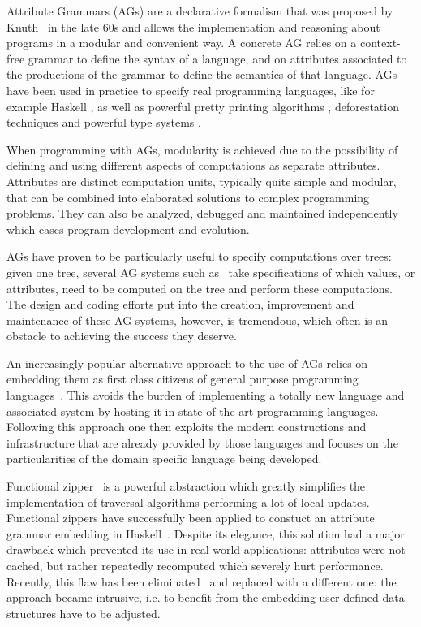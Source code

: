\documentclass[runningheads]{llncs}
\begin{document}
  Attribute Grammars (AGs) are a declarative formalism that was proposed by
  Knuth~\cite{Knuth68} in the late 60s and allows the implementation and
  reasoning about programs in a modular and convenient way. A concrete AG
  relies on a context-free grammar to define the syntax of a language, and on
  attributes associated to the productions of the grammar to define the
  semantics of that language.
  AGs have been used in practice to specify real programming languages, like
  for example Haskell \cite{DijkstraFS09}, as well as powerful pretty printing
  algorithms \cite{SPS99}, deforestation techniques \cite{joao07pepm} and
  powerful type systems \cite{MiddelkoopDS10}.

  When programming with AGs, modularity is achieved due to the possibility of
  defining and using different aspects of computations as separate attributes.
  Attributes are distinct computation units, typically quite simple and modular,
  that can be combined into elaborated solutions to complex programming
  problems. They can also be analyzed, debugged and maintained independently
  which eases program development and evolution.

  AGs have proven to be particularly useful to specify computations over
  trees: given one tree, several AG systems such
  as~\cite{syngen,uuag,lrc,silver} take specifications of which values, or
  attributes, need to be computed on the tree and perform these computations.
  The design and coding efforts put into the creation, improvement and
  maintenance of these AG systems, however, is tremendous, which often is an
  obstacle to achieving the success they deserve.

  An increasingly popular alternative approach to the use of AGs relies on
  embedding them as first class citizens of general purpose programming
  languages~\cite{Oege00,DBLP:conf/sblp/MartinsFS13,erlangAGs,kiama,doaitse09icfp,balestrieri}.
  This avoids the burden of implementing a totally new language and associated
  system by hosting it in state-of-the-art programming languages. Following this
  approach one then exploits the modern constructions and infrastructure that
  are already provided by those languages and focuses on the particularities of
  the domain specific language being developed.

  Functional zipper~\cite{huet1997zipper} is a powerful abstraction which greatly
  simplifies the implementation of traversal algorithms performing a lot of
  local updates. Functional zippers have successfully been applied to constuct
  an attribute grammar embedding in Haskell~\cite{DBLP:conf/sblp/MartinsFS13,MARTINS20162}. Despite its elegance,
  this solution had a major drawback which prevented its use in real-world
  applications: attributes were not cached, but rather repeatedly recomputed
  which severely hurt performance. Recently, this flaw has been
  eliminated~\cite{FERNANDES2018} and replaced with a different one: the approach became
  intrusive, i.e. to benefit from the embedding user-defined data structures
  have to be adjusted.
\end{document}

